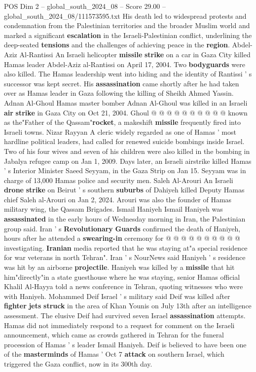 \begin{textsample}{POS Dim 2 – global\_south\_2024\_08 – Score 29.00 – global\_south\_2024\_08/111573595.txt}
His death led to widespread protests and condemnation from the Palestinian territories and the broader Muslim world and marked a significant \textbf{escalation} in the Israeli-Palestinian conflict, underlining the deep-seated \textbf{tensions} and the challenges of achieving peace in the \textbf{region}.
Abdel-Aziz Al-Rantissi An Israeli helicopter \textbf{missile} \textbf{strike} on a car in Gaza City killed Hamas leader Abdel-Aziz al-Rantissi on April 17, 2004.
Two \textbf{bodyguards} were also killed.
The Hamas leadership went into hiding and the identity of Rantissi ' s successor was kept secret.
His \textbf{assassination} came shortly after he had taken over as Hamas leader in Gaza following the killing of Sheikh Ahmed Yassin.
Adnan Al-Ghoul Hamas master bomber Adnan Al-Ghoul was killed in an Israeli \textbf{air} \textbf{strike} in Gaza City on Oct 21, 2004.
Ghoul @ @ @ @ @ @ @ @ @ @ known as the"Father of the Qassam"\textbf{rocket}, a makeshift \textbf{missile} frequently fired into Israeli towns.
Nizar Rayyan A cleric widely regarded as one of Hamas ' most hardline political leaders, had called for renewed suicide bombings inside Israel.
Two of his four wives and seven of his children were also killed in the bombing in Jabalya refugee camp on Jan 1, 2009.
Days later, an Israeli airstrike killed Hamas ' s Interior Minister Saeed Seyyam, in the Gaza Strip on Jan 15.
Seyyam was in charge of 13,000 Hamas police and security men.
Saleh Al-Arouri An Israeli \textbf{drone} \textbf{strike} on Beirut ' s southern \textbf{suburbs} of Dahiyeh killed Deputy Hamas chief Saleh al-Arouri on Jan 2, 2024.
Arouri was also the founder of Hamas military wing, the Qassam Brigades.
Ismail Haniyeh Ismail Haniyeh was \textbf{assassinated} in the early hours of Wednesday morning in Iran, the Palestinian group said.
Iran ' s \textbf{Revolutionary} \textbf{Guards} confirmed the death of Haniyeh, hours after he attended a \textbf{swearing-in} ceremony for @ @ @ @ @ @ @ @ @ @ investigating. \textbf{Iranian} media reported that he was staying at"a special residence for war veterans in north Tehran".
Iran ' s NourNews said Haniyeh ' s residence was hit by an airborne \textbf{projectile}.
Haniyeh was killed by a \textbf{missile} that hit him"directly"in a state guesthouse where he was staying, senior Hamas official Khalil Al-Hayya told a news conference in Tehran, quoting witnesses who were with Haniyeh.
Mohammed Deif Israel ' s military said Deif was killed after \textbf{fighter} \textbf{jets} \textbf{struck} in the area of Khan Younis on July 13th after an intelligence assessment.
The elusive Deif had survived seven Israel \textbf{assassination} attempts.
Hamas did not immediately respond to a request for comment on the Israeli announcement, which came as crowds gathered in Tehran for the funeral procession of Hamas ' s leader Ismail Haniyeh.
Deif is believed to have been one of the \textbf{masterminds} of Hamas ' Oct 7 \textbf{attack} on southern Israel, which triggered the Gaza conflict, now in its 300th day.


\end{textsample}

